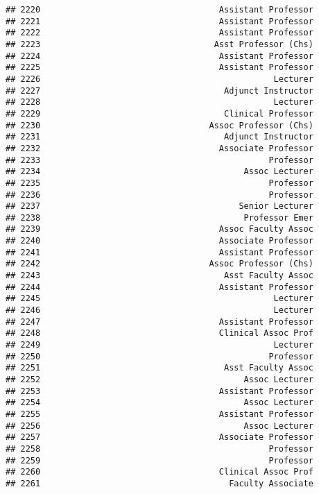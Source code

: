 \documentclass[
]{article}
\begin{document}
\begin{verbatim}
## 2220                                    Assistant Professor
## 2221                                    Assistant Professor
## 2222                                    Assistant Professor
## 2223                                   Asst Professor (Chs)
## 2224                                    Assistant Professor
## 2225                                    Assistant Professor
## 2226                                               Lecturer
## 2227                                     Adjunct Instructor
## 2228                                               Lecturer
## 2229                                     Clinical Professor
## 2230                                  Assoc Professor (Chs)
## 2231                                     Adjunct Instructor
## 2232                                    Associate Professor
## 2233                                              Professor
## 2234                                         Assoc Lecturer
## 2235                                              Professor
## 2236                                              Professor
## 2237                                        Senior Lecturer
## 2238                                         Professor Emer
## 2239                                    Assoc Faculty Assoc
## 2240                                    Associate Professor
## 2241                                    Assistant Professor
## 2242                                  Assoc Professor (Chs)
## 2243                                     Asst Faculty Assoc
## 2244                                    Assistant Professor
## 2245                                               Lecturer
## 2246                                               Lecturer
## 2247                                    Assistant Professor
## 2248                                    Clinical Assoc Prof
## 2249                                               Lecturer
## 2250                                              Professor
## 2251                                     Asst Faculty Assoc
## 2252                                         Assoc Lecturer
## 2253                                    Assistant Professor
## 2254                                         Assoc Lecturer
## 2255                                    Assistant Professor
## 2256                                         Assoc Lecturer
## 2257                                    Associate Professor
## 2258                                              Professor
## 2259                                              Professor
## 2260                                    Clinical Assoc Prof
## 2261                                      Faculty Associate

\end{verbatim}
\end{document}
